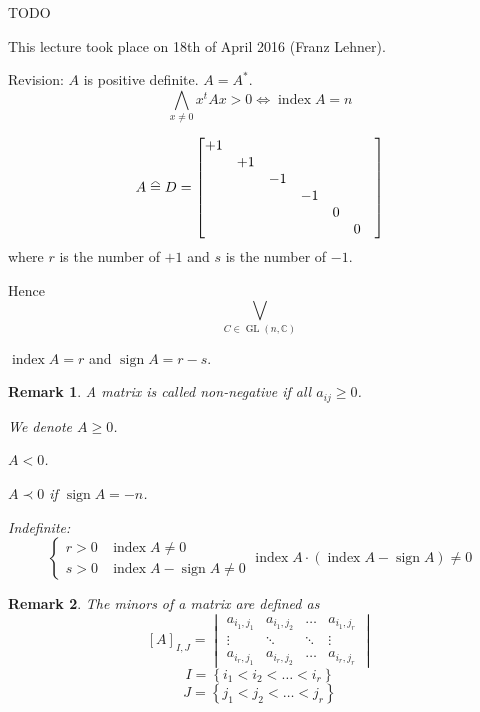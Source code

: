 \documentclass[a4paper,landscape,twocolumn]{article}
\newcommand\meta[3]{This #1 took place on #2 (#3).\par}
\newcommand\set[1]{\left\{#1\right\}}
\newcommand\equalhat{\mathrel{\stackon[1.5pt]{=}{\stretchto{%
    \scalerel*[\widthof{=}]{\wedge}{\rule{1ex}{3ex}}}{0.5ex}}}}
\newtheorem{rem}{Remark}
\DeclareMathOperator\sign{sign}
\DeclareMathOperator\ind{index}
\begin{document}
TODO

\meta{lecture}{18th of April 2016}{Franz Lehner}

Revision:
$A$ is positive definite. $A = A^*$.
\[ \bigwedge_{x \neq 0} x^t A x > 0 \Leftrightarrow \ind{A} = n \]

\[
  A \equalhat D =
  \begin{bmatrix}
    +1 &    &    &    &   &   &  \\
       & +1 &    &    &   &   &  \\
       &    & -1 &    &   &   &  \\
       &    &    & -1 &   &   &  \\
       &    &    &    & 0 &   &  \\
       &    &    &    &   & 0 &  \\
  \end{bmatrix}
\]
where $r$ is the number of $+1$ and $s$ is the number of $-1$.

Hence
\[ \bigvee_{C \in \operatorname{GL}(n,\mathbb C)} \]

$\ind{A} = r$ and $\sign{A} = r - s$.

\begin{rem}
  A matrix is called \emph{non-negative}
  if all $a_{ij} \geq 0$.

  We denote $A \geq 0$.

  $A < 0$.

  $A \prec 0$ if $\sign{A} = -n$.

  Indefinite:
  \[
    \begin{cases}
      r > 0   & \ind{A} \neq 0 \\
      s > 0   & \ind{A} - \sign{A} \neq 0
    \end{cases}
    \ind{A} \cdot (\ind{A} - \sign{A}) \neq 0
  \]
\end{rem}

\begin{rem}
  The \emph{minors of a matrix} are defined as
  \[
    [A]_{I,J} = \begin{vmatrix}
      a_{i_1,j_1} & a_{i_1,j_2} & \ldots & a_{i_1,j_r} \\
      \vdots      & \ddots      & \ddots & \vdots \\
      a_{i_r,j_1} & a_{i_r,j_2} & \ldots & a_{i_r,j_r}
    \end{vmatrix}
  \]
  \[ I = \set{i_1 < i_2 < \ldots < i_r} \]
  \[ J = \set{j_1 < j_2 < \ldots < j_r} \]
\end{rem}
\end{document}
